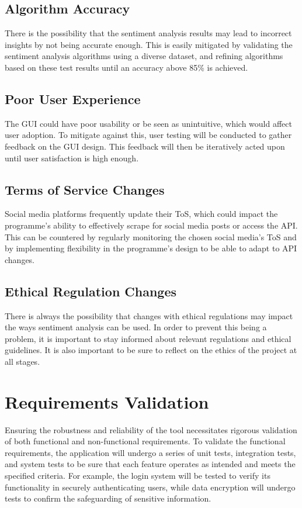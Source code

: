     \subsection{Algorithm Accuracy}
    There is the possibility that the sentiment analysis results may lead to incorrect insights by not being accurate enough. This is easily mitigated by validating the sentiment analysis algorithms using a diverse dataset, and refining algorithms based on these test results until an accuracy above 85\% is achieved. 

    \subsection{Poor User Experience}
    The GUI could have poor usability or be seen as unintuitive, which would affect user adoption. To mitigate against this, user testing will be conducted to gather feedback on the GUI design. This feedback will then be iteratively acted upon until user satisfaction is high enough.

    \subsection{Terms of Service Changes}
    Social media platforms frequently update their ToS, which could impact the programme's ability to effectively scrape for social media posts or access the API. This can be countered by regularly monitoring the chosen social media's ToS and by implementing flexibility in the programme's design to be able to adapt to API changes.

    \subsection{Ethical Regulation Changes}
    There is always the possibility that changes with ethical regulations may impact the ways sentiment analysis can be used. In order to prevent this being a problem, it is important to stay informed about relevant regulations and ethical guidelines. It is also important to be sure to reflect on the ethics of the project at all stages.


\section{Requirements Validation}
Ensuring the robustness and reliability of the tool necessitates rigorous validation of both functional and non-functional requirements. To validate the functional requirements, the application will undergo a series of unit tests, integration tests, and system tests to be sure that each feature operates as intended and meets the specified criteria. For example, the login system will be tested to verify its functionality in securely authenticating users, while data encryption will undergo tests to confirm the safeguarding of sensitive information.

